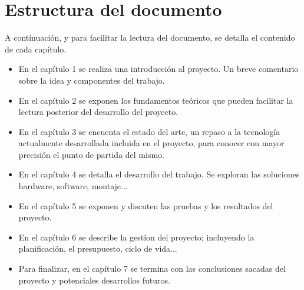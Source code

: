 \section{Estructura del documento}

A continuación, y para facilitar la lectura del documento, se detalla el contenido de cada capítulo.

\begin{itemize}
\item En el capítulo 1 se realiza una introducción al proyecto. Un breve comentario sobre la idea y componentes del trabajo.
\item En el capítulo 2 se exponen los fundamentos teóricos que pueden facilitar la lectura posterior del desarrollo del proyecto.
\item En el capítulo 3 se encuenta el estado del arte, un repaso a la tecnología actualmente desarrollada incluida en el proyecto, para conocer con mayor precisión el punto de partida del mismo.
\item En el capítulo 4 se detalla el desarrollo del trabajo. Se exploran las soluciones hardware, software, montaje...
\item En el capítulo 5 se exponen y discuten las pruebas y los resultados del proyecto.
\item En el capítulo 6 se describe la gestion del proyecto; incluyendo la planificación, el presupuesto, ciclo de vida...
\item Para finalizar, en el capítulo 7 se termina con las conclusiones sacadas del proyecto y potenciales desarrollos futuros.
\end{itemize}
